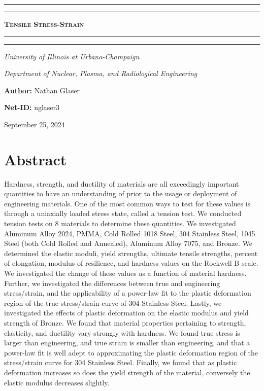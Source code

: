 \documentclass{article}
\begin{document}
\begin{titlepage}

\centering
\scshape
\vspace{\baselineskip}

%
\rule{\textwidth}{1.6pt}\vspace*{-\baselineskip}\vspace*{2pt}
\rule{\textwidth}{0.4pt}

{\Huge \textbf{\textsc{ Tensile Stress-Strain \\
\vspace{15pt}}}}

\rule{\textwidth}{0.4pt}\vspace*{-\baselineskip}\vspace{3.2pt}
\rule{\textwidth}{1.6pt}\vspace{6pt}
\centerline{\textit{University of Illinois at Urbana-Champaign}} 
\centerline{\textit{Department of Nuclear, Plasma, and Radiological Engineering}}
\vspace{1.5\baselineskip}


\large \centerline{\textbf{Author:} Nathan Glaser}
\large \centerline{\textbf{Net-ID:} nglaser3}
\quad

\vfill
\large \centerline{September 25, 2024}
%
\end{titlepage}

\tableofcontents
\newpage
{}

\section{Abstract}
Hardness, strength, and ductility of materials are all exceedingly important quantities to have an understanding of prior to the usage or deployment of engineering materials. One of the most common ways to test for these values is through a uniaxially loaded stress state, called a tension test. We conducted tension tests on 8 materials to determine these quantities. We investigated Aluminum Alloy 2024, PMMA, Cold Rolled 1018 Steel, 304 Stainless Steel, 1045 Steel (both Cold Rolled and Annealed), Aluminum Alloy 7075, and Bronze. We determined the elastic moduli, yield strengths, ultimate tensile strengths, percent of elongation, modulus of resilience, and hardness values on the Rockwell B scale. We investigated the change of these values as a function of material hardness. Further, we investigated the differences between true and engineering stress/strain, and the applicability of a power-law fit to the plastic deformation region of the true stress/strain curve of 304 Stainless Steel. Lastly, we investigated the effects of plastic deformation on the elastic modulus and yield strength of Bronze. We found that material properties pertaining to strength, elasticity, and ductility vary strongly with hardness. We found true stress is larger than engineering, and true strain is smaller than engineering, and that a power-law fit is well adept to approximating the plastic deformation region of the stress/strain curve for 304 Stainless Steel. Finally, we found that as plastic deformation increases so does the yield strength of the material, conversely the elastic modulus decreases slightly. 
\newpage
\end{document}
